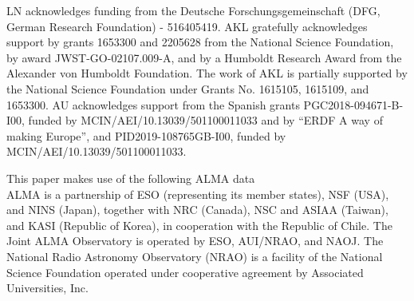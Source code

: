 \documentclass[letter, longauth]{aa} %
\begin{document}
\begin{acknowledgements}
LN acknowledges funding from the Deutsche Forschungsgemeinschaft (DFG, German Research Foundation) - 516405419.
AKL gratefully acknowledges support by grants 1653300 and 2205628 from the National Science Foundation, by award JWST-GO-02107.009-A, and by a Humboldt Research Award from the Alexander von Humboldt Foundation. The work of AKL is partially supported by the National Science Foundation under Grants No. 1615105, 1615109, and 1653300.
AU acknowledges support from the Spanish grants PGC2018-094671-B-I00, funded by MCIN/AEI/10.13039/501100011033 and by ``ERDF A way of making Europe'', and PID2019-108765GB-I00, funded by MCIN/AEI/10.13039/501100011033.

This paper makes use of the following ALMA data \\
ALMA is a partnership of ESO (representing its member states), NSF (USA), and NINS (Japan), together with NRC (Canada), NSC and ASIAA (Taiwan), and KASI (Republic of Korea), in cooperation with the Republic of Chile. The Joint ALMA Observatory is operated by ESO, AUI/NRAO, and NAOJ. The National Radio Astronomy Observatory (NRAO) is a facility of the National Science Foundation operated under cooperative agreement by Associated Universities, Inc.
\end{acknowledgements}



\end{document}
